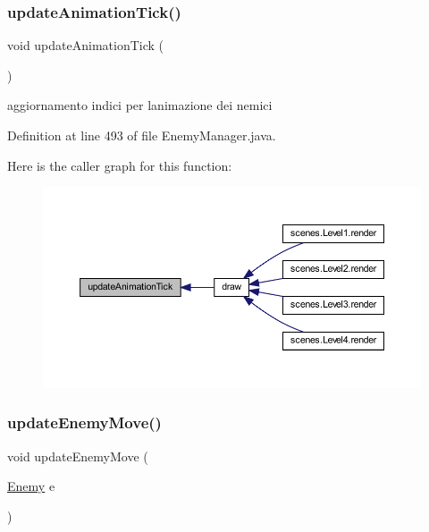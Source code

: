 \subsubsection{\texorpdfstring{update\+Animation\+Tick()}{updateAnimationTick()}}
{\footnotesize\ttfamily void update\+Animation\+Tick (\begin{DoxyParamCaption}{ }\end{DoxyParamCaption})\hspace{0.3cm}{\ttfamily [private]}}



aggiornamento indici per l\textquotesingle{}animazione dei nemici 



Definition at line 493 of file Enemy\+Manager.\+java.

Here is the caller graph for this function\+:
\nopagebreak
\begin{figure}[H]
\begin{center}
\leavevmode
\includegraphics[width=350pt]{classmanagers_1_1_enemy_manager_a5c2bac0f4b9a3ef4e30f60d4b0c3b951_icgraph}
\end{center}
\end{figure}
\mbox{\label{classmanagers_1_1_enemy_manager_a8f172cfa5ade4d4f0a6b89cc6bfc4d12}} 
\subsubsection{\texorpdfstring{update\+Enemy\+Move()}{updateEnemyMove()}}
{\footnotesize\ttfamily void update\+Enemy\+Move (\begin{DoxyParamCaption}\item[{\hyperlink{classenemies_1_1_enemy}{Enemy}}]{e }\end{DoxyParamCaption})}




